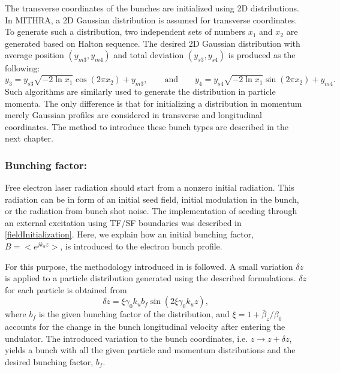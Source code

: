 The transverse coordinates of the bunches are initialized using 2D distributions.
%
In MITHRA, a 2D Gaussian distribution is assumed for transverse coordinates.
%
To generate such a distribution, two independent sets of numbers $x_1$ and $x_2$ are generated based on Halton sequence.
%
The desired 2D Gaussian distribution with average position $(y_{m3},y_{m4})$ and total deviation $(y_{s3},y_{s4})$ is produced as the following: %
%
\begin{equation}
\label{gaussian2D}
\displaystyle y_3 = y_{s3} \sqrt{-2 \ln x_1} \cos(2\pi x_2) + y_{m3}, \qquad \mathrm{and} \qquad
\displaystyle y_4 = y_{s4} \sqrt{-2 \ln x_1} \sin(2\pi x_2) + y_{m4}.
\end{equation}
%
Such algorithms are similarly used to generate the distribution in particle momenta.
%
The only difference is that for initializing a distribution in momentum merely Gaussian profiles are considered in transverse and longitudinal coordinates.
%
The method to introduce these bunch types are described in the next chapter.

\subsubsection{Bunching factor:}

Free electron laser radiation should start from a nonzero initial radiation.
%
This radiation can be in form of an initial seed field, initial modulation in the bunch, or the radiation from bunch shot noise.
%
The implementation of seeding through an external excitation using TF/SF boundaries was described in \ref{fieldInitialization}.
%
Here, we explain how an initial bunching factor, $B = <e^{jk_uz}>$, is introduced to the electron bunch profile.

For this purpose, the methodology introduced in \cite{penman1992simulation} is followed. 
%
A small variation $\delta z$ is applied to a particle distribution generated using the described formulations.
%
$\delta z$ for each particle is obtained from
%
\begin{equation}
\label{bunchingFactor}
\delta z = \xi \gamma_0 k_u b_f \sin (2 \xi \gamma_0 k_u z),
\end{equation}
%
where $b_f$ is the given bunching factor of the distribution, and $\xi=1+\bar{\beta}_z/\beta_0$ accounts for the change in the bunch longitudinal velocity after entering the undulator.
%
The introduced variation to the bunch coordinates, i.e. $z \rightarrow z+\delta z$, yields a bunch with all the given particle and momentum distributions and the desired bunching factor, $b_f$.

